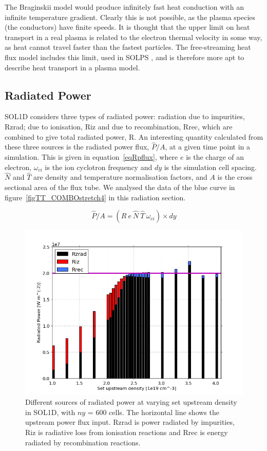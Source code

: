 \documentclass[12pt]{article}  %
\begin{document}
The Braginskii model would produce infinitely fast heat conduction with an infinite temperature gradient. Clearly this is not possible, as the plasma species (the conductors) have finite speeds. It is thought that the upper limit on heat transport in a real plasma is related to the electron thermal velocity in some way, as heat cannot travel faster than the fastest particles. The free-streaming heat flux model includes this limit, used in SOLPS \cite[\S2.1.4]{Schneider2006}, and is therefore more apt to describe heat transport in a plasma model. 


\subsection{Radiated Power}\label{ssecRpower}
SOL1D considers three types of radiated power: radiation due to impurities, Rzrad; due to ionisation, Riz and due to recombination, Rrec, which are combined to give total radiated power, R. An interesting quantity calculated from these three sources is the radiated power flux, $ \hat{P}/A $, at a given time point in a simulation. This is given in equation~\ref{eqRpflux}, where $e$ is the charge of an electron, $\omega_{ci}$ is the ion cyclotron frequency and $dy$ is the simulation cell spacing. $\hat{N}$ and $\hat{T}$ are density and temperature normalisation factors, and $ A $ is the cross sectional area of the flux tube. We analysed the data of the blue curve in figure~\ref{figTT_COMBOstretch4} in this radiation section. 

\begin{equation}\label{eqRpflux}
\hat{P}/A = (R~e~\hat{N}~\hat{T}~\omega_{ci}) \times dy
\end{equation}

\begin{figure}
\includegraphics[scale=0.5]{Figures/sol1d/PRbar600ed.png}
\centering
\caption{Different sources of radiated power at varying set upstream density in SOL1D, with $ny$ = 600 cells. The horizontal line shows the upstream power flux input. Rzrad is power radiated by impurities, Riz is radiative loss from ionisation reactions and Rrec is energy radiated by recombination reactions.}\label{figPRbar600}
\end{figure}
\end{document}

